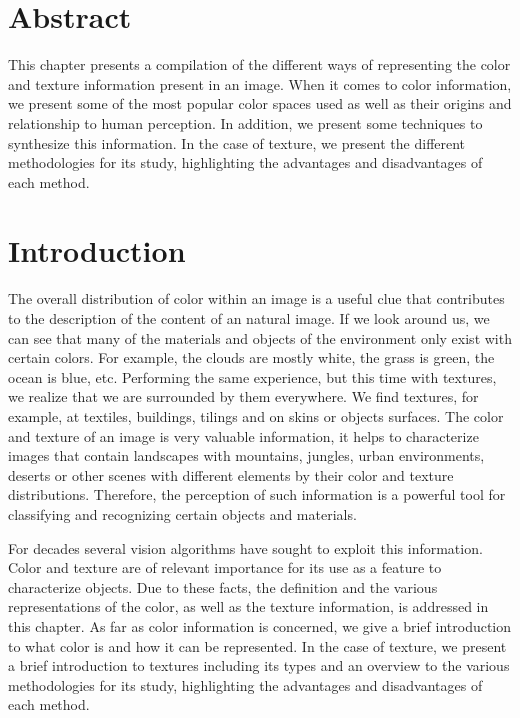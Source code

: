 \section*{Abstract}
\noindent 
This chapter presents a compilation of the different ways of representing the color and texture information present in an image. When it comes to color information, we present some of the most popular color spaces used as well as their origins and relationship to human perception. In addition, we present some techniques to synthesize this information. In the case of texture, we present the different methodologies for its study, highlighting the advantages and disadvantages of each method. 

\section{Introduction}

The overall distribution of color within an image is a useful clue that contributes to the description of the content of an natural image. If we look around us, we can see that many of the materials and objects of the environment only exist with certain colors. For example, the clouds are mostly  white, the grass is green, the ocean is blue, etc. Performing the same experience, but this time with textures, we realize that we are surrounded by them everywhere. We find textures, for example, at textiles, buildings, tilings and on skins or objects surfaces. The color and texture of an image is very valuable information, it helps to characterize images that contain landscapes with mountains, jungles, urban environments, deserts or other scenes with different elements by their color and texture distributions. Therefore, the perception of such information is a powerful tool for classifying and recognizing certain objects and materials.

For decades several vision algorithms have sought to exploit this information. Color and texture are of relevant importance for its use as a feature to characterize objects. Due to these facts, the definition and the various representations of the color, as well as the texture information, is addressed in this chapter. As far as color information is concerned, we give a brief introduction to what color is and how it can be represented. In the case of texture, we present a brief introduction to textures including its types and an overview to the various methodologies for its study, highlighting the advantages and disadvantages of each method. 


